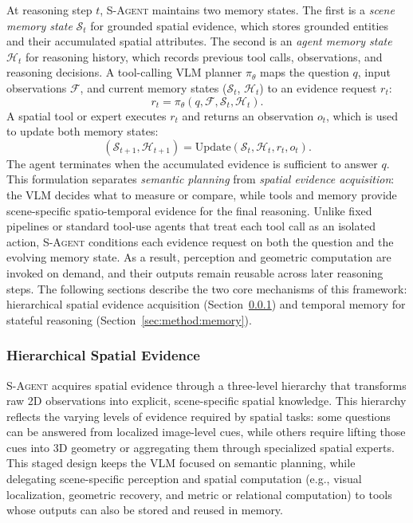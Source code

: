 \documentclass{llmxive}
\begin{document}
At reasoning step $t$, \textsc{S-Agent} maintains two memory states. The first is a \emph{scene memory state} $\mathcal{S}_t$ for grounded spatial evidence, which stores grounded entities and their accumulated spatial attributes. The second is an \emph{agent memory state} $\mathcal{H}_t$ for reasoning history, which records previous tool calls, observations, and reasoning decisions. 
A tool-calling VLM planner $\pi_{\theta}$ maps the question $q$, input observations $\mathcal{F}$, and current memory states ($\mathcal{S}_t$, $\mathcal{H}_t$) to an evidence request $r_t$:
\[
    r_t = \pi_{\theta}(q, \mathcal{F}, \mathcal{S}_t, \mathcal{H}_t).
\]
A spatial tool or expert executes $r_t$ and returns an observation $o_t$, which is used to update both memory states:
\[
    (\mathcal{S}_{t+1}, \mathcal{H}_{t+1}) =
    \mathrm{Update}(\mathcal{S}_t, \mathcal{H}_t, r_t, o_t).
\]
The agent terminates when the accumulated evidence is sufficient to answer $q$. This formulation separates \emph{semantic planning} from \emph{spatial evidence acquisition}: the VLM decides what to measure or compare, while tools and memory provide scene-specific spatio-temporal evidence for the final reasoning.
Unlike fixed pipelines or standard tool-use agents that treat each tool call as an isolated action, \textsc{S-Agent} conditions each evidence request on both the question and the evolving memory state. 
As a result, perception and geometric computation are invoked on demand, and their outputs remain reusable across later reasoning steps. 
The following sections describe the two core mechanisms of this framework: hierarchical spatial evidence acquisition (Section~\ref{sec:method:spatial}) and temporal memory for stateful reasoning (Section~\ref{sec:method:memory}).

\subsubsection{Hierarchical Spatial Evidence}
\label{sec:method:spatial}

\textsc{S-Agent} acquires spatial evidence through a three-level hierarchy that transforms raw 2D observations into explicit, scene-specific spatial knowledge. 
% 
This hierarchy reflects the varying levels of evidence required by spatial tasks: some questions can be answered from localized image-level cues, while others require lifting those cues into 3D geometry or aggregating them through specialized spatial experts. 
% 
This staged design keeps the VLM focused on semantic planning, while delegating scene-specific perception and spatial computation (e.g., visual localization, geometric recovery, and metric or relational computation) to tools whose outputs can also be stored and reused in memory.
\end{document}
